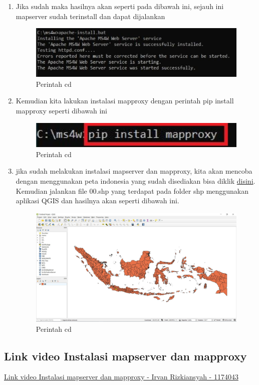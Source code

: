 \begin{enumerate}
			\item Jika sudah maka hasilnya akan seperti pada dibawah ini, sejauh ini mapserver sudah terinstall dan dapat dijalankan
				\begin{figure}[H]
					\includegraphics[width=12cm]{figures/1174043/TUGAS4/4.JPG}
					\centering
					\caption{Perintah cd}
				\end{figure}
				
			\item Kemudian kita lakukan instalasi mapproxy dengan perintah pip install mapproxy seperti dibawah ini
				\begin{figure}[H]
					\includegraphics[width=12cm]{figures/1174043/TUGAS4/5.JPG}
					\centering
					\caption{Perintah cd}
				\end{figure}
				
			\item jika sudah melakukan instalasi mapserver dan mapproxy, kita akan mencoba dengan menggunakan peta indonesia yang sudah disediakan bisa diklik \href{https://github.com/awangga/gede} {disini}. Kemudian jalankan file 00.shp yang terdapat pada folder shp menggunakan aplikasi QGIS dan hasilnya akan seperti dibawah ini.
				\begin{figure}[H]
					\includegraphics[width=12cm]{figures/1174043/TUGAS4/6.JPG}
					\centering
					\caption{Perintah cd}
				\end{figure}
				
		\end{enumerate}
			
	\subsection{Link video Instalasi mapserver dan mapproxy}
		\href{https://youtu.be/i0Igx8knqpQ} {Link video Instalasi mapserver dan mapproxy - Irvan Rizkiansyah - 1174043}